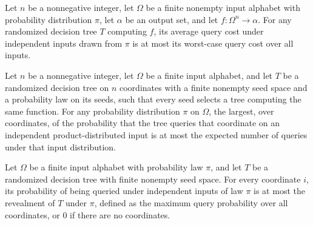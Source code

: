 \begin{theorem}
\label{FABL.RandomizedDecisionTree.averageCost_le_worstCaseCost}
\leanok
{}
Let $n$ be a nonnegative integer, let $\Omega$ be a finite nonempty input alphabet with
probability distribution $\pi$, let $\alpha$ be an output set, and let
$f:\Omega^n\to\alpha$. For any randomized decision tree $T$ computing $f$, its
average query cost under independent inputs drawn from $\pi$ is at most its worst-case
query cost over all inputs.
\end{theorem}

\begin{theorem}
\label{FABL.RandomizedDecisionTree.revealment_le_averageCost}
\leanok
{}
Let $n$ be a nonnegative integer, let $\Omega$ be a finite input alphabet, and let $T$
be a randomized decision tree on $n$ coordinates with a finite nonempty seed space and a
probability law on its seeds, such that every seed selects a tree computing the same
function. For any probability distribution $\pi$ on $\Omega$, the largest, over
coordinates, of the probability that the tree queries that coordinate on an independent
product-distributed input is at most the expected number of queries under that input
distribution.
\end{theorem}

\begin{theorem}
\label{FABL.RandomizedDecisionTree.queryProbability_le_revealment}
\leanok
{}
Let $\Omega$ be a finite input alphabet with probability law $\pi$, and let $T$ be a
randomized decision tree with finite nonempty seed space. For every coordinate $i$, its
probability of being queried under independent inputs of law $\pi$ is at most the
revealment of $T$ under $\pi$, defined as the maximum query probability over all
coordinates, or $0$ if there are no coordinates.
\end{theorem}

